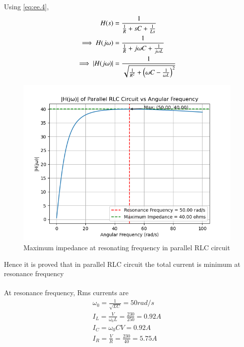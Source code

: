 \documentclass[journal,12pt,twocolumn]{IEEEtran}
\theoremstyle{remark}
\begin{document}
Using \eqref{eq:ee.4},
\begin{align}
     H(s) &=\frac{1}{\frac{1}{R} + sC + \frac{1}{Ls}}\\
     \implies H(j\omega) &=\frac{1}{\frac{1}{R} + j\omega C + \frac{1}{j\omega L}}\\
     \implies \left\vert H(j\omega)\right\vert &= \frac{1}{\sqrt{\frac{1}{R^2} +\left(\omega C - \frac{1}{\omega L}\right)^2}}
\end{align}
\begin{figure}[!ht]
    \centering
    \includegraphics[width=1\linewidth]{figs/m.png}
    \caption{Maximum impedance at resonating frequency in parallel RLC circuit}
\end{figure}

Hence it is proved that in parallel RLC circuit the total current is minimum at resonance frequency\\
   \\
  At resonance frequency, Rms currents are\\
\begin{align}
\omega_0=\frac{1}{\sqrt{LC}}= 50rad/s\\
   I_L=\frac{V}{\omega_0L}=\frac{230}{250}=0.92A\\
   I_C=\omega_0CV= 0.92 A\\
   I_R=\frac{V}{R}=\frac{230}{40}=5.75A\\
 \end{align}
 
\end{document}
